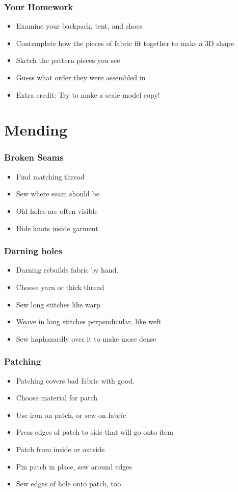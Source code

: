 \documentclass{beamer}
\begin{document}
\begin{frame}[fragile]
\frametitle{Your Homework}
\begin{itemize}[<+(1)->]
\item Examine your backpack, tent, and shoes
\item Contemplate how the pieces of fabric fit together to make a 3D shape
\item Sketch the pattern pieces you see
\item Guess what order they were assembled in
\item Extra credit: Try to make a scale model copy!
\end{itemize}
\end{frame}

\section{Mending}

\begin{frame}[fragile]
\frametitle{Broken Seams}
\begin{itemize}[<+(1)->]
\item Find matching thread
\item Sew where seam should be
\item Old holes are often visible
\item Hide knots inside garment
\end{itemize}
\end{frame}

\begin{frame}[fragile]
\frametitle{Darning holes}
\begin{itemize}[<+(1)->]
\item Darning rebuilds fabric by hand.
\item Choose yarn or thick thread
\item Sew long stitches like warp
\item Weave in long stitches perpendicular, like weft
\item Sew haphazardly over it to make more dense
\end{itemize}
\end{frame}

\begin{frame}[fragile]
\frametitle{Patching}
\begin{itemize}[<+(1)->]
\item Patching covers bad fabric with good.
\item Choose material for patch
\item Use iron on patch, or sew on fabric
\item Press edges of patch to side that will go onto item
\item Patch from inside or outside
\item Pin patch in place, sew around edges
\item Sew edges of hole onto patch, too
\end{itemize}
\end{frame}
\end{document}
